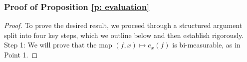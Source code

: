 \documentclass[a4paper, 11pt]{article}
\theoremstyle{definition}
\begin{document}
{\subsubsection{Proof of Proposition \ref{p: evaluation}}
\begin{proof}
	To prove the desired result, we proceed through a structured argument split into four key steps, which we outline below and then establish rigorously.
%	
\\
	{Step 1:} We will prove that the map $(f,x) \mapsto e_x(f)$ is bi-measurable, as in Point 1. 

\end{proof}}
\end{document}
